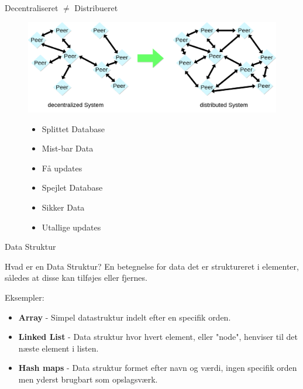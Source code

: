 \documentclass[12pt,t]{beamer}
\begin{document}
\begin{frame}{Decentraliseret $\not =$ Distribueret}
\begin{figure}
	\centering
	\includegraphics[width=1\textwidth]{centri.png}
\end{figure}
\begin{figure}
\begin{minipage}[c]{0.45\textwidth}
	\begin{itemize}
		\item Splittet Database
		\item Mist-bar Data
		\item Få updates
	\end{itemize}
\end{minipage}
\begin{minipage}[c]{0.45\textwidth}
	\begin{itemize}
		\item Spejlet Database
		\item Sikker Data
		\item Utallige updates
	\end{itemize}
\end{minipage}
\end{figure}
\end{frame}

\begin{frame}{Data Struktur}

\begin{block}{Hvad er en Data Struktur?}
	\pause
	En betegnelse for data det er struktureret i elementer, således at disse kan tilføjes eller fjernes.
\end{block}
\pause
Eksempler:
\begin{itemize}
	\item \textbf{Array} - Simpel datastruktur indelt efter en specifik orden.
	\item \textbf{Linked List} - Data struktur hvor hvert element, eller "node", henviser til det næste element i listen. 
	\item \textbf{Hash maps} - Data struktur formet efter navn og værdi, ingen specifik orden men yderst brugbart som opslagsværk.
\end{itemize}
\end{frame}
\end{document}
